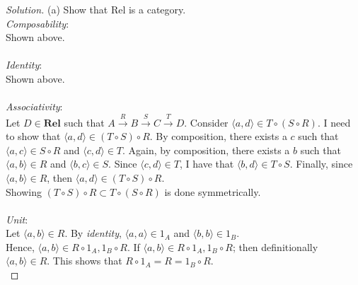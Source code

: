 \documentclass[fontsize=14pt]{scrartcl}
\theoremstyle{definition}
\newenvironment{solution}{
\begin{proof}[Solution]
\vspace{-8px}
\setlength{\parskip}{4px}
\setlength{\parindent}{0px}
}{
\end{proof}
}
\begin{document}
\begin{solution}
(a) Show that Rel is a category.\\
\textit{Composability}:\\
Shown above.\\\\
\textit{Identity}:\\
Shown above.\\\\
\textit{Associativity}:\\
Let $D\in\mathbf{Rel}$ such that $A\xrightarrow{R} B \xrightarrow{S} C\xrightarrow{T} D$. Consider $\langle a,d\rangle\in T\circ(S\circ R)$. 
I need to show that $\langle a,d\rangle\in(T\circ S)\circ R$.
By composition, there exists a $c$ such that $\langle a,c\rangle\in S\circ R$ and
$\langle c,d\rangle\in T$. Again, by composition, 
there exists a $b$ such that $\langle a,b\rangle\in R$ and $\langle b,c\rangle\in S$.
Since $\langle c,d\rangle\in T$, I have that $\langle b,d\rangle\in T\circ S$.
Finally, since $\langle a,b\rangle\in R$, then $\langle a,d\rangle\in(T\circ S)\circ R$.\\
Showing $(T\circ S)\circ R\subset T\circ(S\circ R)$ is done symmetrically.\\
\\
\textit{Unit}:\\
Let $\langle a,b\rangle\in R$. By \textit{identity}, $\langle a,a\rangle\in 1_A$ and $\langle b,b\rangle\in 1_B$. \\
Hence, $\langle a,b\rangle\in R\circ 1_A, 1_B\circ R$. If $\langle a,b\rangle\in R\circ 1_A, 1_B\circ R$; then definitionally $\langle a,b\rangle\in R$.
This shows that $R\circ 1_A=R=1_B\circ R$.\\


\end{solution}
\end{document}
